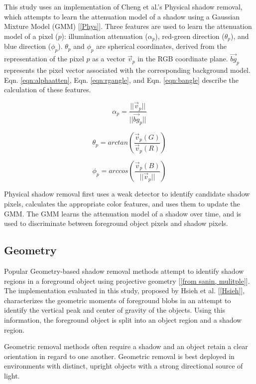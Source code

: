 This study uses an implementation of Cheng et al.'s Physical shadow removal, which attempts to learn the attenuation model of a shadow using a Gaussian Mixture Model (GMM) [\ref{Phys}]. Three features are used to learn the attenuation model of a pixel ($p$): illumination attenuation ($\alpha_{p}$), red-green direction ($\theta_{p}$), and blue direction ($\phi_{p}$). $\theta_{p}$ and $\phi_{p}$ are spherical coordinates, derived from the representation of the pixel $p$ as a vector $\vec{v}_{p}$ in the RGB coordinate plane. $\vec{bg}_{p}$ represents the pixel vector associated with the corresponding background model. Eqn. \ref{eqn:alphaatten}, Eqn. \ref{eqn:rgangle}, and Eqn. \ref{eqn:bangle} describe the calculation of these features.

\begin{equation} \label{eqn:alphaatten}
\alpha_{p} = \dfrac{||\vec{v}_{p}||}{||\vec{bg}_{p}||}
\end{equation}

\begin{equation} \label{eqn:rgangle}
\theta_{p} = arctan(\dfrac{\vec{v}_{p}(G)}{\vec{v}_{p}(R)})
\end{equation}

\begin{equation} \label{eqn:bangle}
\phi_{p} = arccos(\dfrac{\vec{v}_{p}(B)}{||\vec{v}_{p}||})
\end{equation}

Physical shadow removal first uses a weak detector to identify candidate shadow pixels, calculates the appropriate color features, and uses them to update the GMM. The GMM learns the attenuation model of a shadow over time, and is used to discriminate between foreground object pixels and shadow pixels.

\subsection{Geometry}

Popular Geometry-based shadow removal methods attempt to identify shadow regions in a foreground object using projective geometry [\ref{from sanin, mulitple}]. The implementation evaluated in this study, proposed by Hsieh et al. [\ref{Hsieh}], characterizes the geometric moments of foreground blobs in an attempt to identify the vertical peak and center of gravity of the objects. Using this information, the foreground object is split into an object region and a shadow region.

Geometric removal methods often require a shadow and an object retain a clear orientation in regard to one another. Geometric removal is best deployed in environments with distinct, upright objects with a strong directional source of light.  

